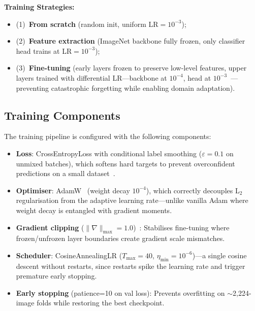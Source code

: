 \documentclass[11pt,a4paper]{article}
\begin{document}
\noindent \textbf{Training Strategies:}
\begin{itemize}
    \item (1)~\textbf{From scratch} (random init, uniform LR$\!=\!10^{-3}$); 
    \item (2)~\textbf{Feature extraction} (ImageNet backbone fully frozen, only classifier head trains at LR$\!=\!10^{-3}$); 
    \item (3)~\textbf{Fine-tuning} (early layers frozen to preserve low-level features, upper layers trained with differential LR---backbone at $10^{-4}$, head at $10^{-3}$~\cite{howard2018}---preventing catastrophic forgetting while enabling domain adaptation).
\end{itemize}

\subsection{Training Components}

The training pipeline is configured with the following components:
\begin{itemize}
    \item \textbf{Loss}: CrossEntropyLoss with conditional label smoothing ($\varepsilon\!=\!0.1$ on unmixed batches), which softens hard targets to prevent overconfident predictions on a small dataset~\cite{szegedy2016}.
    \item \textbf{Optimiser}: AdamW~\cite{loshchilov2019} (weight decay $10^{-4}$), which correctly decouples L$_2$ regularisation from the adaptive learning rate---unlike vanilla Adam where weight decay is entangled with gradient moments.
    \item \textbf{Gradient clipping} ($\|\nabla\|_\text{max}\!=\!1.0$)~\cite{pascanu2013}: Stabilises fine-tuning where frozen/unfrozen layer boundaries create gradient scale mismatches.
    \item \textbf{Scheduler}: CosineAnnealingLR ($T_\text{max}\!=\!40$, $\eta_\text{min}\!=\!10^{-6}$)---a single cosine descent without restarts, since restarts spike the learning rate and trigger premature early stopping.
    \item \textbf{Early stopping} (patience=10 on val loss): Prevents overfitting on $\sim$2{,}224-image folds while restoring the best checkpoint.
\end{itemize}

\end{document}
